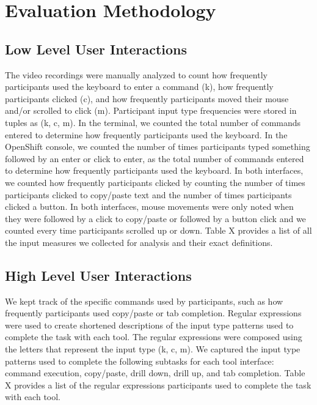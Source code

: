 \documentclass[11pt, oneside]{article}   	%
\begin{document}

\section{Evaluation Methodology}
\subsection{Low Level User Interactions}
The video recordings were manually analyzed to count how frequently participants used the keyboard to enter a command (k), how frequently participants clicked (c), and how frequently participants moved their mouse and/or scrolled to click (m). Participant input type frequencies were stored in tuples as (k, c, m). In the terminal, we counted the total number of commands entered to determine how frequently participants used the keyboard. In the OpenShift console, we counted the number of times participants typed something followed by an enter or click to enter, as the total number of commands entered to determine how frequently participants used the keyboard. In both interfaces, we counted how frequently participants clicked by counting the number of times participants clicked to copy/paste text and the number of times participants clicked a button. In both interfaces, mouse movements were only noted when they were followed by a click to copy/paste or followed by a button click and we counted every time participants scrolled up or down. Table X provides a list of all the input measures we collected for analysis and their exact definitions.

\subsection{High Level User Interactions}
We kept track of the specific commands used by participants, such as how frequently participants used copy/paste or tab completion. Regular expressions were used to create shortened descriptions of the input type patterns used to complete the task with each tool. The regular expressions were composed using the letters that represent the input type (k, c, m). We captured the input type patterns used to complete the following subtasks for each tool interface: command execution, copy/paste, drill down, drill up, and tab completion. Table X provides a list of the regular expressions participants used to complete the task with each tool. 
\end{document}
